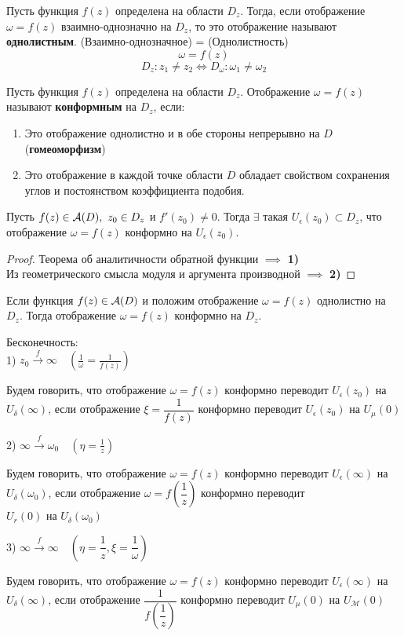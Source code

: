 	\begin{definition}
		Пусть функция $f(z)$ определена на области $D_z$. Тогда, если отображение $\omega = f(z)$ взаимно-однозначно на $D_z$, то это отображение называют \textbf{однолистным}.
		(Взаимно-однозначное) = (Однолистность)
		\[\omega = f(z)\]
		\[D_z : z_1 \neq z_2 \iff D_\omega: \omega_1 \neq \omega_2\]
	\end{definition}
	
	\begin{definition}
		Пусть функция $f(z)$ определена на области $D_z$. Отображение $\omega = f(z)$ называют \textbf{конформным} на $D_z$, если: 
		\begin{enumerate} 
			\item Это отображение однолистно и в обе стороны непрерывно на $D$ (\textbf{гомеоморфизм}) 
			\item Это отображение в каждой точке области $D$ обладает свойством сохранения углов и постоянством коэффициента подобия.
		\end{enumerate}
	\end{definition}
	
	\begin{theorem}
		Пусть $f(z) \in \mathcal{A}(D),\ z_0 \in D_z$ и $f'(z_0) \neq 0$. Тогда $\exists$ такая $U_\epsilon(z_0) \subset D_z$, что отображение $\omega = f(z)$ конформно на $U_\epsilon(z_0)$.
	\end{theorem}
	
	\begin{proof}
		Теорема об аналитичности обратной функции $\implies$ \textbf{1)} \\ 
		Из геометрического смысла модуля и аргумента производной $\implies$ \textbf{2)}
	\end{proof}
	\begin{theorem} 
		Если функция $f(z) \in \mathcal{A}(D)$ и положим отображение $\omega = f(z)$ однолистно на $D_z$. Тогда отображение $\omega = f(z)$ конформно на $D_z$.
	\end{theorem}
	Бесконечность: \\ 
	1) $z_0 \xrightarrow{f} \infty \quad (\frac{1}{\omega} = \frac{1}{f(z)})$
	\begin{definition}
		Будем говорить, что отображение $\omega = f(z)$ конформно переводит $U_\epsilon(z_0)$ на $U_\delta(\infty)$, если отображение $\xi = \dfrac{1}{f(z)}$ конформно переводит $U_\epsilon(z_0)$ на $U_\mu(0)$
	\end{definition}
	2) $\infty \xrightarrow{f} \omega_0 \quad (\eta = \frac{1}{z})$
	\begin{definition}
		Будем говорить, что отображение $\omega = f(z)$ конформно переводит $U_\epsilon(\infty)$ на $U_\delta(\omega_0)$, если отображение $\omega = f(\dfrac{1}{z})$ конформно переводит $U_r(0) \text{ на } U_\delta(\omega_0)$
	\end{definition}
	3) $\infty \xrightarrow{f} \infty \quad (\eta = \dfrac{1}{z}, \xi = \dfrac{1}{\omega})$
	\begin{definition}
		Будем говорить, что отображение $\omega = f(z)$ конформно переводит $U_\epsilon(\infty)$ на $U_\delta(\infty)$, если отображение $\dfrac{1}{f(\dfrac{1}{z})}$ конформно переводит $U_\mu (0) \text{ на } U_\mathcal{M}(0)$
	\end{definition}
	
